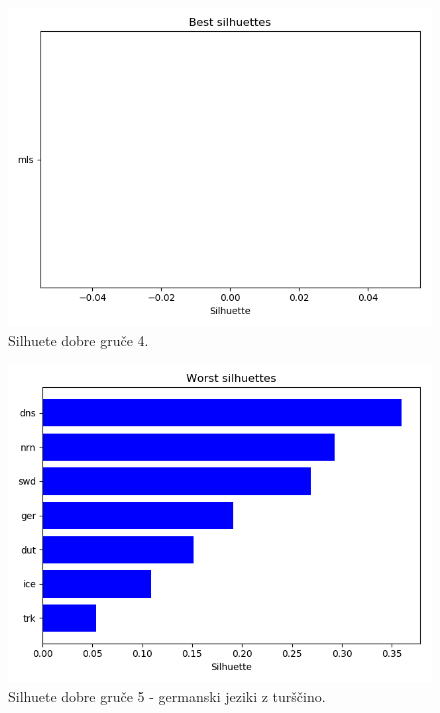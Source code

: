 \documentclass[a4paper,11pt]{article}
\begin{document}
\begin{figure}[htbp]
	\begin{center}
		\includegraphics[scale=0.5]{best4.png}
		\caption{Silhuete dobre gruče 4.}
		\label{slika1}
	\end{center}
\end{figure}

\begin{figure}[htbp]
	\begin{center}
		\includegraphics[scale=0.5]{worst5.png}
		\caption{Silhuete dobre gruče 5 - germanski jeziki z turščino.}
		\label{slika1}
	\end{center}
\end{figure}
\end{document}
